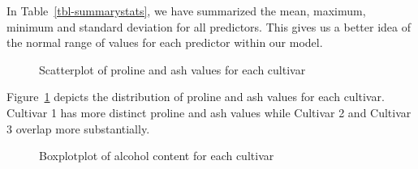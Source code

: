 \documentclass[
  letterpaper,
  DIV=11,
  numbers=noendperiod]{scrartcl}
\begin{document}
In Table~\ref{tbl-summarystats}, we have summarized the mean, maximum,
minimum and standard deviation for all predictors. This gives us a
better idea of the normal range of values for each predictor within our
model.

\begin{figure}


\caption{\label{fig-scatterplot}Scatterplot of proline and ash values
for each cultivar}

\end{figure}%

Figure~\ref{fig-scatterplot} depicts the distribution of proline and ash
values for each cultivar. Cultivar 1 has more distinct proline and ash
values while Cultivar 2 and Cultivar 3 overlap more substantially.

\begin{figure}


\caption{\label{fig-boxplot}Boxplotplot of alcohol content for each
cultivar}

\end{figure}%
\end{document}
